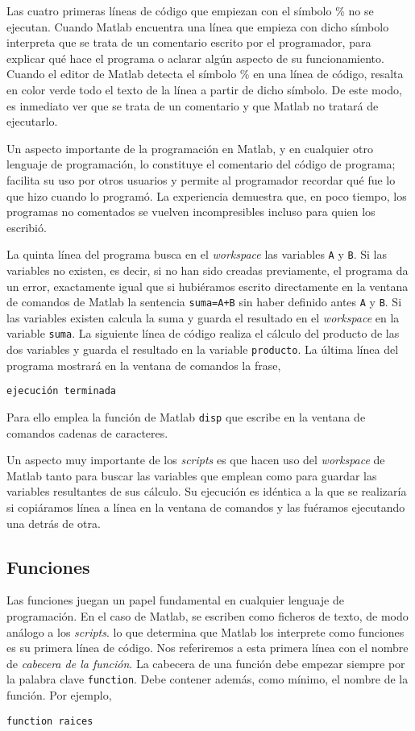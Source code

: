 Las cuatro primeras líneas de código que empiezan con el símbolo \% no se ejecutan. Cuando Matlab encuentra una línea que empieza con dicho símbolo interpreta que se trata de un comentario escrito por el programador, para explicar qué hace el programa o aclarar algún aspecto de su funcionamiento. Cuando el editor de Matlab detecta el símbolo \% en una línea de código, resalta en color verde todo el texto de la línea a partir de dicho símbolo. De este modo, es inmediato ver que se trata de un comentario y que Matlab no tratará de ejecutarlo.

Un aspecto importante de la programación en Matlab, y en cualquier otro lenguaje de programación, lo constituye el comentario del código de programa; facilita su uso por otros usuarios y permite al programador recordar qué fue lo que hizo cuando lo programó. La experiencia demuestra que, en poco tiempo, los programas no comentados se vuelven incompresibles incluso para quien los escribió.

La quinta línea del programa busca en el \emph{workspace} las variables \texttt{A} y \texttt{B}. Si las variables no existen, es decir, si no han sido creadas previamente, el programa da un error, exactamente igual que si hubiéramos escrito directamente en la ventana de comandos de Matlab la sentencia \texttt{suma=A+B} sin haber definido antes \texttt{A} y \texttt{B}. Si las variables existen calcula la suma y guarda el resultado en el \emph{workspace} en la variable \texttt{suma}. La siguiente línea de código realiza el cálculo del producto de las dos variables y guarda el resultado en la variable \texttt{producto}. La última línea del programa mostrará en la ventana de comandos la frase,

\begin{verbatim}
ejecución terminada
\end{verbatim}
Para ello emplea la función de Matlab \texttt{disp} que escribe en la ventana de comandos cadenas de caracteres.

Un aspecto muy importante de los \emph{scripts} es que hacen uso del \emph{workspace} de Matlab tanto para buscar las variables que emplean como para guardar las variables resultantes de sus cálculo. Su ejecución es idéntica a la que se realizaría si copiáramos línea a línea en la ventana de comandos y las fuéramos ejecutando una detrás de otra.

\subsection{Funciones} 
Las funciones juegan un papel fundamental en cualquier lenguaje de programación. En el caso de Matlab, se escriben como ficheros de texto, de modo análogo a los \emph{scripts}. lo que determina que Matlab los interprete como funciones es su primera línea de código.  Nos referiremos a esta primera línea con el nombre de \emph{cabecera de la función}. La cabecera de una función debe empezar siempre por la palabra clave \texttt{function}. Debe contener además, como mínimo, el nombre de la función. Por ejemplo,
\begin{verbatim}
function raices
\end{verbatim}

